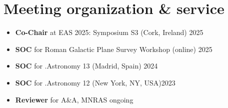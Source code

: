 \section*{Meeting organization \& service}

\begin{itemize}
    \item \textbf{Co-Chair} at EAS 2025: Symposium S3 (Cork, Ireland) \hfill 2025
    \item \textbf{SOC} for Roman Galactic Plane Survey Workshop (online) \hfill 2025
    \item \textbf{SOC} for .Astronomy 13 (Madrid, Spain) \hfill 2024
    \item \textbf{SOC} for .Astronomy 12 (New York, NY, USA)\hfill 2023
    \item \textbf{Reviewer} for A\&A, MNRAS \hfill ongoing
\end{itemize}
